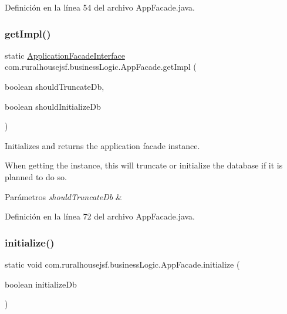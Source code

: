 Definición en la línea 54 del archivo App\+Facade.\+java.

\mbox{\label{classcom_1_1ruralhousejsf_1_1business_logic_1_1_app_facade_aab339d9b44293704c9214aef70c7c704}} 
\subsubsection{\texorpdfstring{getImpl()}{getImpl()}\hspace{0.1cm}{\footnotesize\ttfamily [3/3]}}
{\footnotesize\ttfamily static \mbox{\hyperlink{interfacecom_1_1ruralhousejsf_1_1business_logic_1_1_application_facade_interface}{Application\+Facade\+Interface}} com.\+ruralhousejsf.\+business\+Logic.\+App\+Facade.\+get\+Impl (\begin{DoxyParamCaption}\item[{boolean}]{should\+Truncate\+Db,  }\item[{boolean}]{should\+Initialize\+Db }\end{DoxyParamCaption})\hspace{0.3cm}{\ttfamily [static]}}

Initializes and returns the application facade instance. 

When getting the instance, this will truncate or initialize the database if it is planned to do so.


\begin{DoxyParams}{Parámetros}
{\em should\+Truncate\+Db} & \\
\hline
\end{DoxyParams}


Definición en la línea 72 del archivo App\+Facade.\+java.

\mbox{\label{classcom_1_1ruralhousejsf_1_1business_logic_1_1_app_facade_a48252ec119a6bb16f5353df6ec6eff54}} 
\subsubsection{\texorpdfstring{initialize()}{initialize()}}
{\footnotesize\ttfamily static void com.\+ruralhousejsf.\+business\+Logic.\+App\+Facade.\+initialize (\begin{DoxyParamCaption}\item[{boolean}]{initialize\+Db }\end{DoxyParamCaption})\hspace{0.3cm}{\ttfamily [static]}}

